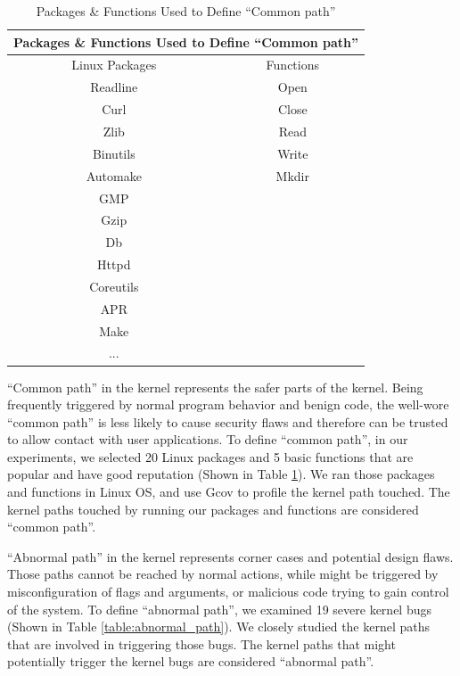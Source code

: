 \begin{table}
\begin{tabular}{cc}
\toprule
\multicolumn{2}{c}{Packages \& Functions Used to Define ``Common path''} \\

\midrule
Linux Packages    &  Functions \\
\midrule
Readline & Open \\
Curl & Close \\
Zlib & Read \\
Binutils & Write \\
Automake & Mkdir \\
GMP & \\
Gzip & \\
Db & \\
Httpd & \\
Coreutils & \\
APR & \\
Make & \\
... & \\

\bottomrule
\end{tabular}
\caption {Packages \& Functions Used to Define ``Common path''}
\label{table:common_path}
\end{table}


\par
``Common path'' in the kernel represents the safer parts of the kernel. Being frequently triggered by normal program behavior and benign code, the well-wore ``common path'' is less likely to cause security flaws and therefore can be trusted to allow contact with user applications. To define ``common path'', in our experiments, we selected 20 Linux packages and 5 basic functions that are popular and have good reputation (Shown in Table \ref{table:common_path}). We ran those packages and functions in Linux OS, and use Gcov to profile the kernel path touched. The kernel paths touched by running our packages and functions are considered ``common path''. 

\par
``Abnormal path'' in the kernel represents corner cases and potential design flaws. Those paths cannot be reached by normal actions, while might be triggered by misconfiguration of flags and arguments, or malicious code trying to gain control of the system.  
To define ``abnormal path'', we examined 19 severe kernel bugs (Shown in Table \ref{table:abnormal_path}). We closely studied the kernel paths that are involved in triggering those bugs. The kernel paths that might potentially trigger the kernel bugs are considered ``abnormal path''. 


